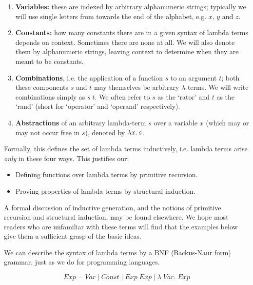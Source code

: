 \begin{enumerate}

\item {\bf Variables:} these are indexed by arbitrary alphanumeric strings;
typically we will use single letters from towards the end of the alphabet, e.g.
$x$, $y$ and $z$.

\item {\bf Constants:} how many constants there are in a given syntax of lambda
terms depends on context. Sometimes there are none at all. We will also
denote them by alphanumeric strings, leaving context to determine when they are
meant to be constants.

\item {\bf Combinations}, i.e. the application of a function $s$ to an argument
$t$; both these components $s$ and $t$ may themselves be arbitrary
$\lambda$-terms. We will write combinations simply as $s\;t$. We often
refer to $s$ as the `rator' and $t$ as the `rand' (short for `operator' and
`operand' respectively).

\item {\bf Abstractions} of an arbitrary lambda-term $s$ over a variable
$x$ (which may or may not occur free in $s$), denoted by $\lambda x.\: s$.

\end{enumerate}

Formally, this defines the set of lambda terms inductively, i.e. lambda
terms arise {\em only} in these four ways. This justifies our:

\begin{itemize}

\item Defining functions over lambda terms by primitive recursion.

\item Proving properties of lambda terms by structural induction.

\end{itemize}

A formal discussion of inductive generation, and the notions of primitive
recursion and structural induction, may be found elsewhere. We hope most
readers who are unfamiliar with these terms will find that the examples below
give them a sufficient grasp of the basic ideas.

We can describe the syntax of lambda terms by a BNF (Backus-Naur form)
grammar, just as we do for programming languages.

$$ Exp = Var \mid Const \mid Exp\; Exp \mid \lambda\; Var . \; Exp $$

